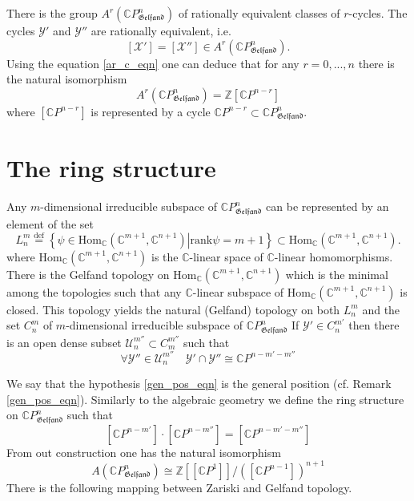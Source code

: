 \documentclass{beamer}
\theoremstyle{plain}
\newcommand{\Z}{\mathbb{Z}}
\newcommand{\be}{\begin{equation}}
\newcommand{\ee}{\end{equation}}
\newcommand{\C}{\mathbb{C}}
\newcommand{\Hom}{\mathrm{Hom}}
\newcommand{\sU}{\mathcal{U}}       %
\newcommand{\sX}{\mathcal{X}}       %
\newcommand{\sY}{\mathcal{Y}}       %
\newcommand{\rank}{\mathrm{rank}}                  %
\newcommand{\bydef}{\stackrel{\mathrm{def}}{=}}
\begin{document}
\begin{frame}

There is the group $A^r\left(\C P^n_{\mathfrak{Gelfand}} \right)$ of rationally equivalent  classes of $r$-cycles. The cycles $\sY'$ and $\sY''$ are rationally equivalent, i.e.
\be\label{ar_c_eqn}
\left[\sX'\right]= \left[\sX''\right]\in A^r\left(\C P^n_{\mathfrak{Gelfand}} \right).
\ee
Using the equation \eqref{ar_c_eqn} one can deduce that for any $r = 0,..., n$ there is the natural isomorphism
\be
A^r\left(\C P^n_{\mathfrak{Gelfand}} \right) = \Z \left[\C P^{n-r}\right]
\ee
where  $\left[\C P^{n-r}\right]$ is represented by a cycle $\C P^{n-r} \subset \C P^n_{\mathfrak{Gelfand}}$.
\end{frame}
\section{The ring structure}
\begin{frame}
Any $m$-dimensional irreducible subspace  of $\C P^n_{\mathfrak{Gelfand}}$ can be represented by an element of the set
$$
L^m_n \bydef \left\{\left.\psi \in \Hom_\C\left(\C^{m + 1}, \C^{n+1}  \right) \right| \rank \psi = m + 1 \right\}\subset \Hom_\C\left(\C^{m + 1}, \C^{n+1}  \right).
$$
where $\Hom_\C\left(\C^{m + 1}, \C^{n+1}  \right)$ is the  $\C$-linear space of  $\C$-linear homomorphisms. There is the \alert{ Gelfand  topology} on $\Hom_\C\left(\C^{m + 1}, \C^{n+1}  \right)$ which is the minimal among the topologies such that any $\C$-linear subspace of $\Hom_\C\left(\C^{m + 1}, \C^{n+1}  \right)$ is closed. This topology yields the natural (Gelfand) topology on both $L^m_n$ and the set $C^m_n$ of $m$-dimensional irreducible subspace  of $\C P^n_{\mathfrak{Gelfand}}$  If $\sY' \in C^{m'}_n$ then there is an open dense subset $\sU^{m''}_n \subset C^{m''}_m$ such that
\be\label{gen_pos_eqn}
\forall \sY'' \in \sU^{m''}_n \quad \sY' \cap \sY'' \cong \C P^{n - m' - m''}
\ee
\end{frame}
\begin{frame}
We say that the hypothesis \eqref{gen_pos_eqn} is the \alert{general position} (cf. Remark \ref{gen_pos_eqn}). Similarly to the algebraic geometry we define the ring structure on $\C P^n_{\mathfrak{Gelfand}}$ such that
\be
\left[\C P^{n-m'}\right]\cdot \left[\C P^{n-m''}\right]= \left[\C P^{n-m'-m''}\right]
\ee
From out construction one has the natural isomorphism
$$
A\left( \C P^n_{\mathfrak{Gelfand}}\right) \cong \Z\left[\left[\C P^1\right]\right] /\left( \left[\C P^{n-1}\right] \right)^{n+1}
$$
There is the following mapping between Zariski and Gelfand topology.
\end{frame}
\end{document}
